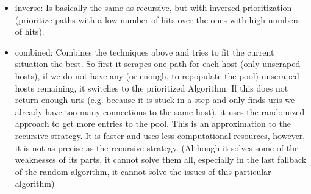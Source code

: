 \begin{itemize}
\begin{itemize}
\begin{itemize}
        \item inverse: Is basically the same as recursive, but with inversed prioritization (prioritize paths with a low number of hits over the ones with high numbers of hits).
        \item combined: Combines the techniques above and tries to fit the current situation the best. So first it scrapes one path for each host (only unscraped hosts), if we do not have any (or enough, to repopulate the pool) unscraped hosts remaining, it switches to the prioritized Algorithm. If this does not return enough uris (e.g. because it is stuck in a step and only finds uris we already have too many connections to the same host), it uses the randomized approach to get more entries to the pool. 
        This is an approximation to the recursive strategy. It is faster and uses less computational resources, however, it is not as precise as the recursive strategy. (Although it solves some of the weaknesses of its parts, it cannot solve them all, especially in the last fallback of the random algorithm, it cannot solve the issues of this particular algorithm)
      \end{itemize}


\end{itemize}
\end{itemize}
